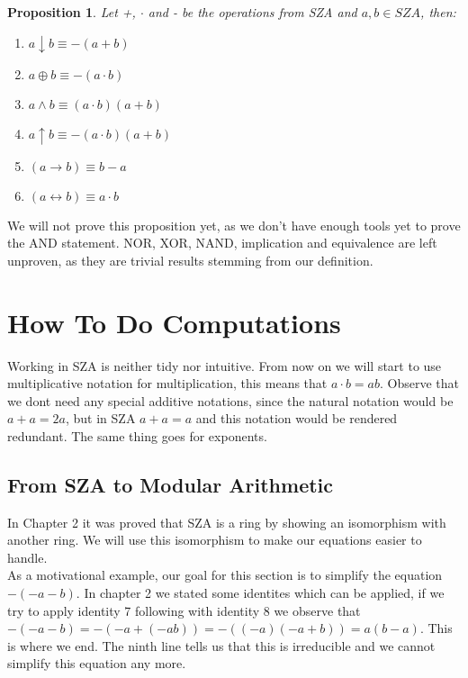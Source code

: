 \documentclass[12pt]{report}
\newtheorem{proposition}{Proposition}[section]
\theoremstyle{definition}
\theoremstyle{remark}
\begin{document}
      \begin{proposition}
        Let +, $\cdot$ and - be the operations from SZA and $a,b\in SZA$, then:
        \begin{enumerate}
        \item $a\downarrow b\equiv -(a+b)$
        \item $a\oplus b\equiv -(a\cdot b)$
        \item $a\wedge b\equiv (a\cdot b)(a+b)$
        \item $a\uparrow b\equiv -(a\cdot b)(a+b)$
        \item $(a\rightarrow b)\equiv b-a$
        \item $(a\leftrightarrow b)\equiv a\cdot b$
        \end{enumerate}
      \end{proposition}
      
      We will not prove this proposition yet, as we don't have enough tools yet to prove the AND statement. NOR, XOR, NAND, implication and equivalence are left unproven, as they are trivial results stemming from our definition.
      
      \section{How To Do Computations}
    Working in SZA is neither tidy nor intuitive. From now on we will start to use multiplicative notation for multiplication, this means that $a\cdot b = ab$. Observe that we dont need any special additive notations, since the natural notation would be $a+a=2a$, but in SZA $a+a=a$ and this notation would be rendered redundant. The same thing goes for exponents.
    \subsection{From SZA to Modular Arithmetic}
      In Chapter 2 it was proved that SZA is a ring by showing an isomorphism with another ring. We will use this isomorphism to make our equations easier to handle.\\

      As a motivational example, our goal for this section is to simplify the equation $-(-a-b)$. In chapter 2 we stated some identites which can be applied, if we try to apply identity 7 following with identity 8 we observe that  $-(-a-b)=-(-a+(-ab))=-((-a)(-a+b))=a(b-a)$. This is where we end. The ninth line tells us that this is irreducible and we cannot simplify this equation any more.\\
\end{document}
